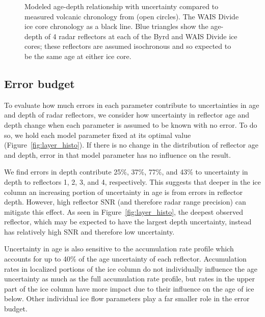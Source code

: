 \begin{figure*}[h]
\centering
{}
\caption{Modeled age-depth relationship with uncertainty compared to measured volcanic chronology from \citet[]{hammer1997} (open circles). The WAIS Divide ice core chronology \citep{buizert2015} as a black line. Blue triangles show the age-depth of 4 radar reflectors at each of the Byrd and WAIS Divide ice cores; these reflectors are assumed isochronous and so expected to be the same age at either ice core.}
\label{fig:spaghetti}
\end{figure*}

\subsection{Error budget}
To evaluate how much errors in each parameter contribute to uncertainties in age and depth of radar reflectors, we consider how uncertainty in reflector age and depth change when each parameter is assumed to be known with no error. To do so, we hold each model parameter fixed at its optimal value (Figure~\ref{fig:layer_histo}). If there is no change in the distribution of reflector age and depth, error in that model parameter has no influence on the result.

We find errors in depth contribute 25\%, 37\%, 77\%, and 43\% to uncertainty in depth to reflectors 1, 2, 3, and 4, respectively. This suggests that deeper in the ice column an increasing portion of uncertainty in age is from errors in reflector depth. However, high reflector SNR (and therefore radar range precision) can mitigate this effect. As seen in Figure~\ref{fig:layer_histo}, the deepest observed reflector, which may be expected to have the largest depth uncertainty, instead has relatively high SNR and therefore low uncertainty.

Uncertainty in age is also sensitive to the accumulation rate profile which accounts for up to 40\% of the age uncertainty of each reflector. 
Accumulation rates in localized portions of the ice column do not individually influence the age uncertainty as much as the full accumulation rate profile, but rates in the upper part of the ice column have more impact due to their influence on the age of ice below. Other individual ice flow parameters play a far smaller role in the error budget.




